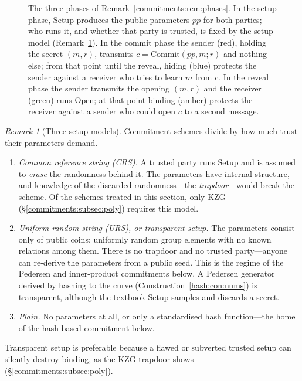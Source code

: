 \documentclass[11pt,a4paper]{article}
\theoremstyle{definition}
\theoremstyle{remark}
\newtheorem{remark}[theorem]{Remark}
\begin{document}
\begin{figure}[tp]
\caption{The three phases of Remark~\ref{commitments:rem:phases}. In the setup
phase, $\mathrm{Setup}$ produces the public parameters $pp$ for both parties;
who runs it, and whether that party is trusted, is fixed by the setup model
(Remark~\ref{commitments:rem:setup-trust}). In the commit phase the sender
(red), holding the secret $(m, r)$, transmits $c = \mathrm{Commit}(pp, m; r)$
and nothing else; from that point until the reveal, hiding (blue) protects the
sender against a receiver who tries to learn $m$ from $c$. In the reveal phase
the sender transmits the opening $(m, r)$ and the receiver (green) runs
$\mathrm{Open}$; at that point binding (amber) protects the receiver against a
sender who could open $c$ to a second message.}
\label{fig:commit-phases}
\end{figure}

\begin{remark}[Three setup models]\label{commitments:rem:setup-trust}
Commitment schemes divide by how much trust their parameters demand.
\begin{enumerate}
\item \emph{Common reference string (CRS).} A trusted party runs
  \(\mathrm{Setup}\) and is assumed to \emph{erase} the randomness
  behind it. The parameters have internal structure, and knowledge of
  the discarded randomness---the \emph{trapdoor}---would break the
  scheme. Of the schemes treated in this section, only KZG
  (\S\ref{commitments:subsec:poly}) requires this model.
\item \emph{Uniform random string (URS), or transparent setup.} The
  parameters consist only of public coins: uniformly random group
  elements with no known relations among them. There is no trapdoor
  and no trusted party---anyone can re-derive the parameters from a
  public seed. This is the regime of the Pedersen and inner-product
  commitments below. A Pedersen generator derived by hashing to the
  curve (Construction~\ref{hash:con:nums}) is transparent, although the
  textbook \(\mathrm{Setup}\) samples and discards a secret.
\item \emph{Plain.} No parameters at all, or only a standardised hash
  function---the home of the hash-based commitment below.
\end{enumerate}
Transparent setup is preferable because a flawed or subverted trusted
setup can silently destroy binding, as the KZG trapdoor shows
(\S\ref{commitments:subsec:poly}).
\end{remark}
\end{document}
